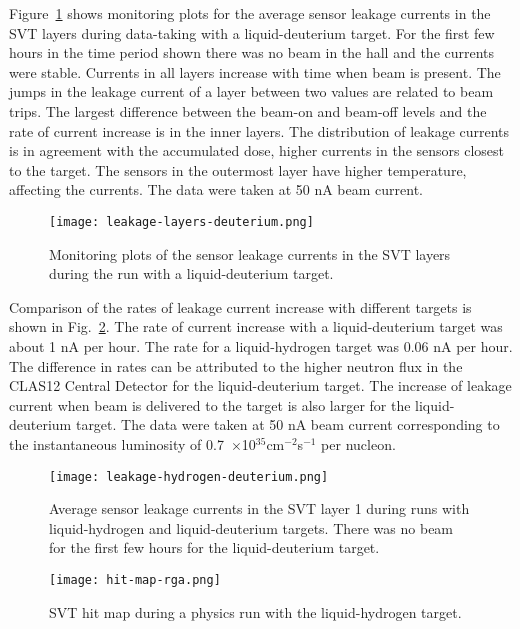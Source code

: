 Figure~\ref{fig:leakage-layers-deuterium} shows monitoring plots for the average sensor leakage currents in the SVT layers during data-taking with a liquid-deuterium target. For the first few hours in the time period shown there was no beam in the hall and the currents were stable. Currents in all layers increase with time when beam is present. The jumps in the leakage current of a layer between two values are related to beam trips. The largest difference between the beam-on and beam-off levels and the rate of current increase is in the inner layers. The distribution of leakage currents is in agreement with the accumulated dose, higher currents in the sensors closest to the target. The sensors in the outermost layer have higher temperature, affecting the currents. The data were taken at 50 nA beam current. 

\begin{figure}[hbt] 
\centering 
\texttt{[image: leakage-layers-deuterium.png]}
\caption{Monitoring plots of the sensor leakage currents in the SVT layers during the run with a liquid-deuterium target.}
\label{fig:leakage-layers-deuterium}
\end{figure}

Comparison of the rates of leakage current increase with different targets is shown in Fig.~\ref{fig:leakage-hydrogen-deuterium}. The rate of current increase with a liquid-deuterium target was about 1 nA per hour. The rate for a liquid-hydrogen target was 0.06 nA per hour. The difference in rates can be attributed to the higher neutron flux in the CLAS12 Central Detector for the liquid-deuterium target. The increase of leakage current when beam is delivered to the target is also larger for the liquid-deuterium target. The data were taken at 50 nA beam current corresponding to the instantaneous luminosity of 0.7~$\times$10$^{35}$cm$^{-2}$s$^{-1}$ per nucleon.

\begin{figure}[hbt] 
\centering 
\texttt{[image: leakage-hydrogen-deuterium.png]}
\caption{Average sensor leakage currents in the SVT layer 1 during runs with liquid-hydrogen and liquid-deuterium targets. There was no beam for the first few hours for the liquid-deuterium target.}
\label{fig:leakage-hydrogen-deuterium}
\end{figure}

\begin{figure}[hbt] 
\centering 
\texttt{[image: hit-map-rga.png]}
\caption{SVT hit map during a physics run with the liquid-hydrogen target.}
\label{fig:hit-map-rga}
\end{figure}

